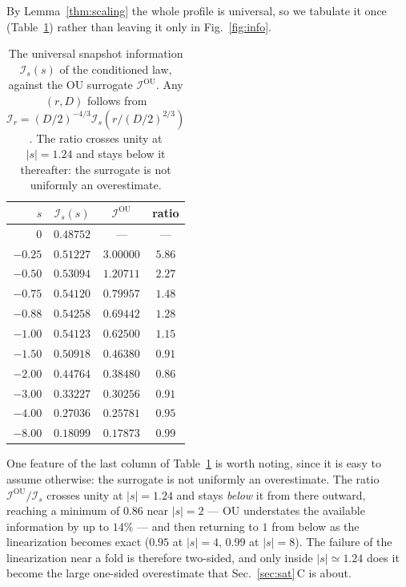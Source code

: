 \documentclass[%
 twocolumn,
 superscriptaddress,
 amsmath,amssymb,
 aps,
 pre,
 floatfix,
]{revtex4-2}
\newcommand{\Ifish}{\mathcal{I}}
\begin{document}
By Lemma~\ref{thm:scaling} the whole profile is universal, so we tabulate it once (Table~\ref{tab:profile}) rather than leaving it only in Fig.~\ref{fig:info}.
\begin{table}[b]
\caption{\label{tab:profile}%
The universal snapshot information $\Ifish_s(s)$ of the conditioned law, against the OU surrogate $\Ifish^{\mathrm{OU}}$.  Any $(r,D)$ follows from $\Ifish_r=(D/2)^{-4/3}\Ifish_s(r/(D/2)^{2/3})$.  The ratio crosses unity at $|s|=1.24$ and stays below it thereafter: the surrogate is not uniformly an overestimate.}
\begin{ruledtabular}
\begin{tabular}{rccc}
\hline
$s$ & $\Ifish_s(s)$ & $\Ifish^{\mathrm{OU}}$ & ratio \\
\hline
$0$      & $0.48752$ & --- & --- \\
$-0.25$  & $0.51227$ & $3.00000$ & $5.86$ \\
$-0.50$  & $0.53094$ & $1.20711$ & $2.27$ \\
$-0.75$  & $0.54120$ & $0.79957$ & $1.48$ \\
$-0.88$  & $0.54258$ & $0.69442$ & $1.28$ \\
$-1.00$  & $0.54123$ & $0.62500$ & $1.15$ \\
$-1.50$  & $0.50918$ & $0.46380$ & $0.91$ \\
$-2.00$  & $0.44764$ & $0.38480$ & $0.86$ \\
$-3.00$  & $0.33227$ & $0.30256$ & $0.91$ \\
$-4.00$  & $0.27036$ & $0.25781$ & $0.95$ \\
$-8.00$  & $0.18099$ & $0.17873$ & $0.99$ \\
\end{tabular}
\end{ruledtabular}
\end{table}
One feature of the last column of Table~\ref{tab:profile} is worth noting, since it is easy to assume otherwise: the surrogate is not uniformly an overestimate.  The ratio $\Ifish^{\mathrm{OU}}/\Ifish_s$ crosses unity at $|s|=1.24$ and stays \emph{below} it from there outward, reaching a minimum of $0.86$ near $|s|=2$ --- OU understates the available information by up to $14\%$ --- and then returning to $1$ from below as the linearization becomes exact ($0.95$ at $|s|=4$, $0.99$ at $|s|=8$).  The failure of the linearization near a fold is therefore two-sided, and only inside $|s|\simeq1.24$ does it become the large one-sided overestimate that Sec.~\ref{sec:sat}\,C is about.
\end{document}
